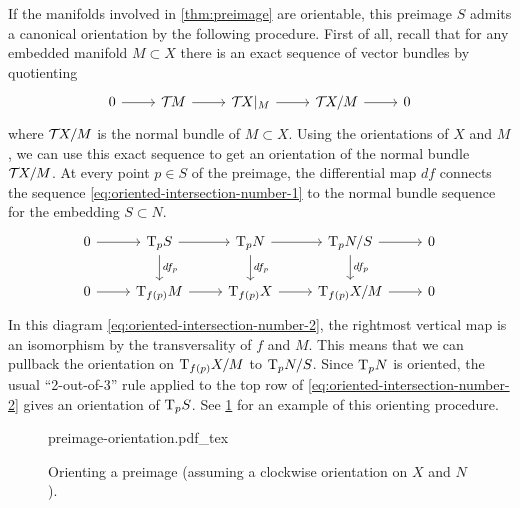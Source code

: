 If the manifolds involved in \cref{thm:preimage} are orientable, this preimage $S$ admits a canonical orientation by the following procedure. First of all, recall that for any embedded manifold $M\subset X$ there is an exact sequence of vector bundles by quotienting
\begin{equation}\label{eq:oriented-intersection-number-1}
	\begin{tikzcd}
		0 & {\TT M} & {\TT X}|_M & {\TT X/M} & 0
		\arrow[from=1-1, to=1-2]
		\arrow[from=1-2, to=1-3]
		\arrow[from=1-3, to=1-4]
		\arrow[from=1-4, to=1-5]
	\end{tikzcd}
\end{equation}
where ${\mathcal{T}\hspace{-0.1em}} X/M$ is the normal bundle of $M\subset X$. Using the orientations of $X$ and $M$, we can use this exact sequence to get an orientation of the normal bundle ${\mathcal{T}\hspace{-0.1em}} X/M$. At every point $p\in S$ of the preimage, the differential map $df$ connects the sequence \cref{eq:oriented-intersection-number-1} to the normal bundle sequence for the embedding $S\subset N$.
\begin{equation}\label{eq:oriented-intersection-number-2}
	\begin{tikzcd}
		0 & {\T_pS} & {\T_p N} & {\T_p N/S} & 0 \\
		0 & {\T_{f(p)}M} & {\T_{f(p)}X} & {\T_{f(p)}X/M} & 0
		\arrow[from=1-1, to=1-2]
		\arrow[from=1-2, to=1-3]
		\arrow["{df_p}", from=1-2, to=2-2]
		\arrow[from=1-3, to=1-4]
		\arrow["{df_p}", from=1-3, to=2-3]
		\arrow[from=1-4, to=1-5]
		\arrow["{df_p}", from=1-4, to=2-4]
		\arrow[from=2-1, to=2-2]
		\arrow[from=2-2, to=2-3]
		\arrow[from=2-3, to=2-4]
		\arrow[from=2-4, to=2-5]
	\end{tikzcd}
\end{equation}
In this diagram \cref{eq:oriented-intersection-number-2}, the rightmost vertical map is an isomorphism by the transversality of $f$ and $M$. This means that we can pullback the orientation on $\mathrm{T}_{f(p)} X/M$ to $\mathrm{T}_p N/S$. Since $\mathrm{T}_p N$ is oriented, the usual ``2-out-of-3'' rule applied to the top row of \cref{eq:oriented-intersection-number-2} gives an orientation of $\mathrm{T}_p S$. See \cref{fig:preimage-orientation} for an example of this orienting procedure.

\begin{figure}[ht]
	\centering
	{preimage-orientation.pdf_tex}
	\caption{Orienting a preimage (assuming a clockwise orientation on $X$ and $N$).}\label{fig:preimage-orientation}
\end{figure}

